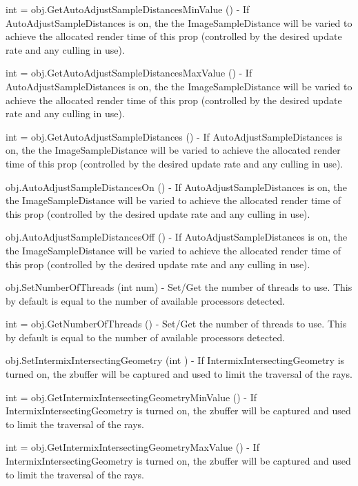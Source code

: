 \begin{DoxyItemize}
\item {\ttfamily int = obj.\-Get\-Auto\-Adjust\-Sample\-Distances\-Min\-Value ()} -\/ If Auto\-Adjust\-Sample\-Distances is on, the the Image\-Sample\-Distance will be varied to achieve the allocated render time of this prop (controlled by the desired update rate and any culling in use).  
\item {\ttfamily int = obj.\-Get\-Auto\-Adjust\-Sample\-Distances\-Max\-Value ()} -\/ If Auto\-Adjust\-Sample\-Distances is on, the the Image\-Sample\-Distance will be varied to achieve the allocated render time of this prop (controlled by the desired update rate and any culling in use).  
\item {\ttfamily int = obj.\-Get\-Auto\-Adjust\-Sample\-Distances ()} -\/ If Auto\-Adjust\-Sample\-Distances is on, the the Image\-Sample\-Distance will be varied to achieve the allocated render time of this prop (controlled by the desired update rate and any culling in use).  
\item {\ttfamily obj.\-Auto\-Adjust\-Sample\-Distances\-On ()} -\/ If Auto\-Adjust\-Sample\-Distances is on, the the Image\-Sample\-Distance will be varied to achieve the allocated render time of this prop (controlled by the desired update rate and any culling in use).  
\item {\ttfamily obj.\-Auto\-Adjust\-Sample\-Distances\-Off ()} -\/ If Auto\-Adjust\-Sample\-Distances is on, the the Image\-Sample\-Distance will be varied to achieve the allocated render time of this prop (controlled by the desired update rate and any culling in use).  
\item {\ttfamily obj.\-Set\-Number\-Of\-Threads (int num)} -\/ Set/\-Get the number of threads to use. This by default is equal to the number of available processors detected.  
\item {\ttfamily int = obj.\-Get\-Number\-Of\-Threads ()} -\/ Set/\-Get the number of threads to use. This by default is equal to the number of available processors detected.  
\item {\ttfamily obj.\-Set\-Intermix\-Intersecting\-Geometry (int )} -\/ If Intermix\-Intersecting\-Geometry is turned on, the zbuffer will be captured and used to limit the traversal of the rays.  
\item {\ttfamily int = obj.\-Get\-Intermix\-Intersecting\-Geometry\-Min\-Value ()} -\/ If Intermix\-Intersecting\-Geometry is turned on, the zbuffer will be captured and used to limit the traversal of the rays.  
\item {\ttfamily int = obj.\-Get\-Intermix\-Intersecting\-Geometry\-Max\-Value ()} -\/ If Intermix\-Intersecting\-Geometry is turned on, the zbuffer will be captured and used to limit the traversal of the rays.  

\end{DoxyItemize}
